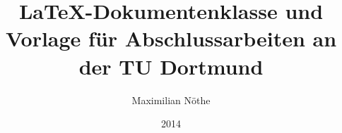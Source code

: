 \documentclass[
  tucolor,       %
  BCOR=12mm,     %
  parskip=half,  %
  open=any,      %
  cleardoublepage=plain,  %
]{tudothesis}
\author{Maximilian Nöthe}
\title{\LaTeX-Dokumentenklasse und Vorlage für Abschlussarbeiten an der TU Dortmund}
\date{2014}
\begin{document}
\frontmatter

\maketitle

\makecorrectorpage


\tableofcontents

\mainmatter





\appendix


\backmatter
\printbibliography

\cleardoublepage

\end{document}
